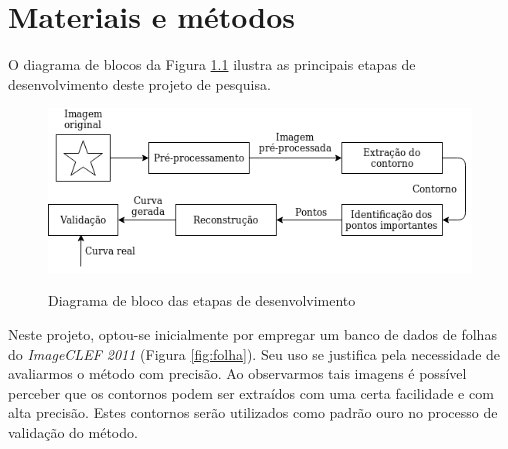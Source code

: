 \documentclass[
	12pt,				%
	oneside,			%
	a4paper,			%
	sumario=tradicional,
	english,			%
	french,				%
	spanish,			%
	brazil,				%
]{abntex2}
\begin{document}




\chapter{Materiais e métodos}

O diagrama de blocos da Figura \ref{fig:diagrama} ilustra as principais etapas de desenvolvimento deste projeto de pesquisa. 

\begin{figure}[htb]
\centering
    \caption{Diagrama de bloco das etapas de desenvolvimento}
    \includegraphics[width=.7\linewidth]{./img/diagrama.png}
    \label{fig:diagrama}
\end{figure}

Neste projeto, optou-se inicialmente por empregar um banco de dados de folhas do \textit{ImageCLEF 2011} (Figura \ref{fig:folha}). Seu uso se justifica pela necessidade de avaliarmos o método com precisão. Ao observarmos tais imagens é possível perceber que os contornos podem ser extraídos com uma certa facilidade e com alta precisão. Estes contornos serão utilizados como padrão ouro no processo de validação do método.
\end{document}
